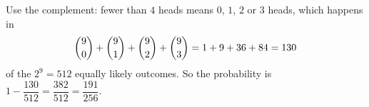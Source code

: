 Use the complement: fewer than $4$ heads means $0$, $1$, $2$ or $3$ heads, which happens in
\[
\dbinom90+\dbinom91+\dbinom92+\dbinom93=1+9+36+84=130
\]
of the $2^9=512$ equally likely outcomes. So the probability is $1-\dfrac{130}{512}=\dfrac{382}{512}=\boxed{\dfrac{191}{256}}$.
